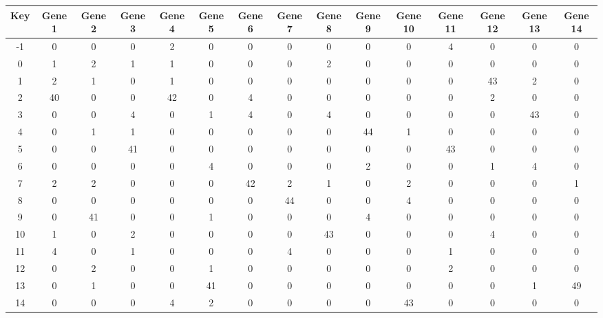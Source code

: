 \begin{tabular}{|c|c|c|c|c|c|c|c|c|c|c|c|c|c|c|}
\hline
Key & Gene 1 & Gene 2 & Gene 3 & Gene 4 & Gene 5 & Gene 6 & Gene 7 & Gene 8 & Gene 9 & Gene 10 & Gene 11 & Gene 12 & Gene 13 & Gene 14 \\
\hline
-1 & 0 & 0 & 0 & 2 & 0 & 0 & 0 & 0 & 0 & 0 & 4 & 0 & 0 & 0 \\
0 & 1 & 2 & 1 & 1 & 0 & 0 & 0 & 2 & 0 & 0 & 0 & 0 & 0 & 0 \\
1 & 2 & 1 & 0 & 1 & 0 & 0 & 0 & 0 & 0 & 0 & 0 & 43 & 2 & 0 \\
2 & 40 & 0 & 0 & 42 & 0 & 4 & 0 & 0 & 0 & 0 & 0 & 2 & 0 & 0 \\
3 & 0 & 0 & 4 & 0 & 1 & 4 & 0 & 4 & 0 & 0 & 0 & 0 & 43 & 0 \\
4 & 0 & 1 & 1 & 0 & 0 & 0 & 0 & 0 & 44 & 1 & 0 & 0 & 0 & 0 \\
5 & 0 & 0 & 41 & 0 & 0 & 0 & 0 & 0 & 0 & 0 & 43 & 0 & 0 & 0 \\
6 & 0 & 0 & 0 & 0 & 4 & 0 & 0 & 0 & 2 & 0 & 0 & 1 & 4 & 0 \\
7 & 2 & 2 & 0 & 0 & 0 & 42 & 2 & 1 & 0 & 2 & 0 & 0 & 0 & 1 \\
8 & 0 & 0 & 0 & 0 & 0 & 0 & 44 & 0 & 0 & 4 & 0 & 0 & 0 & 0 \\
9 & 0 & 41 & 0 & 0 & 1 & 0 & 0 & 0 & 4 & 0 & 0 & 0 & 0 & 0 \\
10 & 1 & 0 & 2 & 0 & 0 & 0 & 0 & 43 & 0 & 0 & 0 & 4 & 0 & 0 \\
11 & 4 & 0 & 1 & 0 & 0 & 0 & 4 & 0 & 0 & 0 & 1 & 0 & 0 & 0 \\
12 & 0 & 2 & 0 & 0 & 1 & 0 & 0 & 0 & 0 & 0 & 2 & 0 & 0 & 0 \\
13 & 0 & 1 & 0 & 0 & 41 & 0 & 0 & 0 & 0 & 0 & 0 & 0 & 1 & 49 \\
14 & 0 & 0 & 0 & 4 & 2 & 0 & 0 & 0 & 0 & 43 & 0 & 0 & 0 & 0 \\
\hline
\end{tabular}